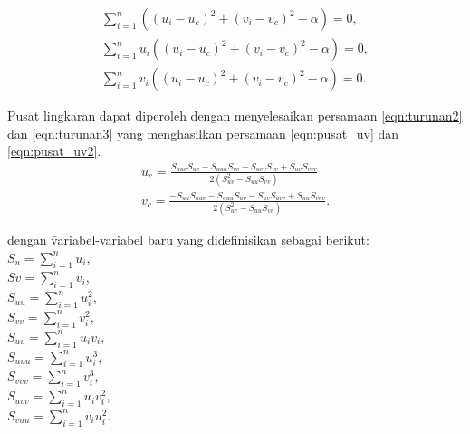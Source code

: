 \begin{align}
    \label{eqn:turunan1}
    \sum_{i=1}^n ((u_i-u_c)^2+(v_i-v_c)^2-\alpha)=0, \\
    \label{eqn:turunan2}
    \sum_{i=1}^n u_i((u_i-u_c)^2+(v_i-v_c)^2-\alpha)=0, \\
    \label{eqn:turunan3}
    \sum_{i=1}^n v_i((u_i-u_c)^2+(v_i-v_c)^2-\alpha)=0.
\end{align}

Pusat lingkaran dapat diperoleh dengan menyelesaikan persamaan \ref*{eqn:turunan2} dan \ref*{eqn:turunan3} yang menghasilkan persamaan \ref*{eqn:pusat_uv} dan \ref*{eqn:pusat_uv2}.
\begin{align}
    \label{eqn:pusat_uv}
    u_c=\frac{S_{uuv}S_{uv}-S_{uuu}S_{vv}-S_{uvv}S_{vv}+S_{uv}S_{vvv}}{2(S^2_{uv}-S_{uu}S_{vv})}\\
    \label{eqn:pusat_uv2}
    v_c=\frac{-S_{uu}S_{uuv}-S_{uuu}S_{uv}-S_{uv}S_{uvv}+S_{uu}S_{vvv}}{2(S^2_{uv}-S_{uu}S_{vv})}.
\end{align}
\begin{tabbing}
    dengan \=variabel-variabel baru yang didefinisikan sebagai berikut:\\
    
    \>$S_u = \sum_{i=1}^n u_i$,\\
    \>$Sv = \sum_{i=1}^n v_i$,\\
    \>$S_{uu} = \sum_{i=1}^n u_i^2$,\\
    \>$S_{vv} = \sum_{i=1}^n v_i^2$,\\
    \>$S_{uv} = \sum_{i=1}^n u_i v_i$,\\
    \>$S_{uuu} = \sum_{i=1}^n u_i^3$,\\
    \>$S_{vvv} = \sum_{i=1}^n v_i^3$,\\
    \>$S_{uvv} = \sum_{i=1}^n u_i v_i^2$,\\
    \>$S_{vuu} = \sum_{i=1}^n v_i u_i^2$.
\end{tabbing}

